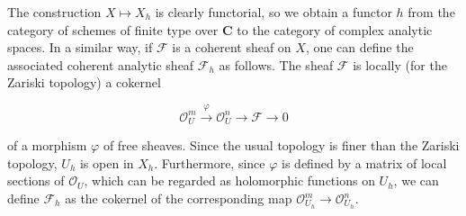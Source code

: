 The construction $X \mapsto X_h$ is clearly functorial, so we obtain a functor $h$ from the category of schemes of finite type over $\mathbf{C}$ to the category of complex analytic spaces. In a similar way, if $\mathcal{F}$ is a coherent sheaf on $X$, one can define the associated coherent analytic sheaf $\mathcal{F}_h$ as follows. The sheaf $\mathcal{F}$ is locally (for the Zariski topology) a cokernel

$$\mathcal{O}_U^m \xrightarrow{\varphi} \mathcal{O}_U^n \rightarrow \mathcal{F} \rightarrow 0$$

of a morphism $\varphi$ of free sheaves. Since the usual topology is finer than the Zariski topology, $U_h$ is open in $X_h$. Furthermore, since $\varphi$ is defined by a matrix of local sections of $\mathcal{O}_U$, which can be regarded as holomorphic functions on $U_h$, we can define $\mathcal{F}_h$ as the cokernel of the corresponding map $\mathcal{O}_{U_h}^m \to \mathcal{O}_{U_h}^n$.
